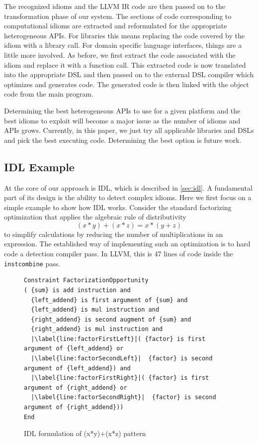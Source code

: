     The recognized idioms and the LLVM IR code are then passed on
    to the transformation phase of our system.
    The sections of code corresponding to computational idioms are extracted
    and reformulated for the appropriate heterogeneous APIs.
    For libraries this means replacing
    the code covered by the idiom with a library call. 
    For domain specific language interfaces,
    things are a little more involved. As before, we first extract the code
    associated with the idiom and replace it with a function call. This
    extracted code is now translated into the appropriate DSL and then
    passed on to the external DSL compiler which optimizes and generates
    code. The generated code is then linked
    with the object code from the main program.

    Determining the best heterogeneous APIs to use for a given platform
    and the best idioms to exploit will become a major issue as the number
    of idioms and APIs grows.  Currently, in this paper, we just try all
    applicable libraries and DSLs and pick the best executing
    code. Determining the best option is future work.


\subsection{IDL Example}

    At the core of our approach is IDL, which is described in \autoref{sec:idl}.
    A fundamental part of its design is the
    ability to detect  complex idioms.  Here we first focus on a simple example
    to show how IDL works.  Consider the standard factorizing
    optimization that applies the algebraic rule of distributivity
    \[(x*y)+(x*z) = x*(y+z)\]
    to simplify calculations by reducing the number of multiplications in an
    expression.
    The established way of implementing such an optimization is to hard code a
    detection compiler pass.
    In LLVM, this is 47 lines of code inside the \texttt{instcombine} pass.

\begin{figure}[t]
\begin{lstlisting}[language={constraints},escapechar=|]
Constraint FactorizationOpportunity
( {sum} is add instruction and
  {left_addend} is first argument of {sum} and
  {left_addend} is mul instruction and
  {right_addend} is second augment of {sum} and
  {right_addend} is mul instruction and
  |\label{line:factorFirstLeft}|( {factor} is first argument of {left_addend} or
  |\label{line:factorSecondLeft}|  {factor} is second argument of {left_addend}) and
  |\label{line:factorFirstRight}|( {factor} is first argument of {right_addend} or
  |\label{line:factorSecondRight}|  {factor} is second argument of {right_addend}))
End
\end{lstlisting}
\vspace{-0.3cm}
\caption{IDL formulation of (x*y)+(x*z) pattern}
\label{fig:IDLfactorization}
\end{figure}

